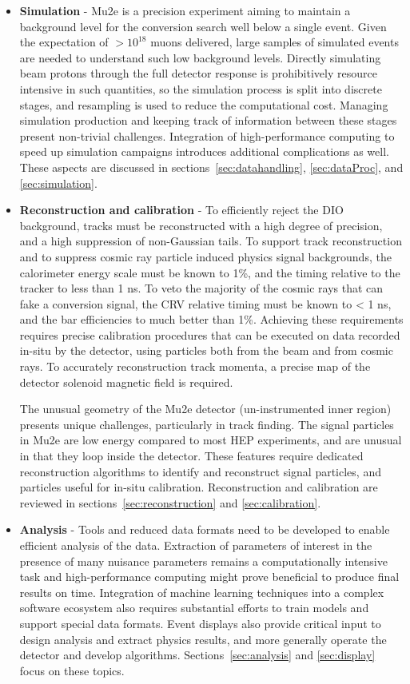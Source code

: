 \begin{itemize}

\item[] {\bf Simulation} - Mu2e is a precision experiment aiming to maintain a background level for the conversion search well below a single event. Given the expectation of $>10^{18}$ muons delivered, large samples of simulated events are needed to understand such low background levels. Directly simulating beam protons through the full detector response is prohibitively resource intensive in such quantities, so the simulation process is split into discrete stages, and resampling is used to reduce the computational cost. Managing simulation production and keeping track of information between these stages present non-trivial challenges. Integration of high-performance computing to speed up simulation campaigns introduces additional complications as well. These aspects are discussed in sections~\ref{sec:datahandling}, \ref{sec:dataProc}, and \ref{sec:simulation}.

\item[] {\bf Reconstruction and calibration} - To efficiently reject the DIO background, tracks must be reconstructed with a high degree of precision, and a high suppression of non-Gaussian tails. To support track reconstruction and to suppress cosmic ray particle induced physics signal backgrounds, the calorimeter energy scale must be known to 1\%, and the timing relative to the tracker to less than 1 ns. To veto the majority of the cosmic rays that can fake a conversion signal, the CRV relative timing must be known to < 1 ns, and the bar efficiencies to much better than 1\%. Achieving these requirements requires precise calibration procedures that can be executed on data recorded in-situ by the detector, using particles both from the beam and from cosmic rays. To accurately reconstruction track momenta, a precise map of the detector solenoid magnetic field is required.

The unusual geometry of the Mu2e detector (un-instrumented inner region) presents unique challenges, particularly in track finding. The signal particles in Mu2e are low energy compared to most HEP experiments, and are unusual in that they loop inside the detector. These features require dedicated reconstruction algorithms to identify and reconstruct signal particles, and particles useful for in-situ calibration.
Reconstruction and calibration are reviewed in sections~\ref{sec:reconstruction} and \ref{sec:calibration}.
 
\item[] {\bf Analysis} - Tools and reduced data formats need to be developed to enable efficient analysis of the data. Extraction of parameters of interest in the presence of many nuisance parameters remains a computationally intensive task and high-performance computing might prove beneficial to produce final results on time. Integration of machine learning techniques into a complex software ecosystem also requires substantial efforts to train models and support special data formats. Event displays also provide critical input to design analysis and extract physics results, and more generally operate the detector and develop algorithms. Sections~\ref{sec:analysis} and \ref{sec:display} focus on these topics.


\end{itemize}
